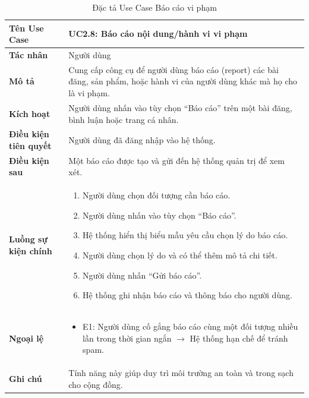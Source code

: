 \begin{table}[H]
\centering
\begin{tabularx}{\textwidth}{|l|X|}
\hline
\textbf{Tên Use Case} & \textbf{UC2.8: Báo cáo nội dung/hành vi vi phạm} \\ \hline
\textbf{Tác nhân} & Người dùng \\ \hline
\textbf{Mô tả} & Cung cấp công cụ để người dùng báo cáo (report) các bài đăng, sản phẩm, hoặc hành vi của người dùng khác mà họ cho là vi phạm. \\ \hline
\textbf{Kích hoạt} & Người dùng nhấn vào tùy chọn ``Báo cáo'' trên một bài đăng, bình luận hoặc trang cá nhân. \\ \hline
\textbf{Điều kiện tiên quyết} & Người dùng đã đăng nhập vào hệ thống. \\ \hline
\textbf{Điều kiện sau} & Một báo cáo được tạo và gửi đến hệ thống quản trị để xem xét. \\ \hline
\textbf{Luồng sự kiện chính} & 
\begin{enumerate}
    \item Người dùng chọn đối tượng cần báo cáo.
    \item Người dùng nhấn vào tùy chọn ``Báo cáo''.
    \item Hệ thống hiển thị biểu mẫu yêu cầu chọn lý do báo cáo.
    \item Người dùng chọn lý do và có thể thêm mô tả chi tiết.
    \item Người dùng nhấn ``Gửi báo cáo''.
    \item Hệ thống ghi nhận báo cáo và thông báo cho người dùng.
\end{enumerate} \\ \hline
\textbf{Ngoại lệ} & 
\begin{itemize}
    \item E1: Người dùng cố gắng báo cáo cùng một đối tượng nhiều lần trong thời gian ngắn $\rightarrow$ Hệ thống hạn chế để tránh spam.
\end{itemize} \\ \hline
\textbf{Ghi chú} & Tính năng này giúp duy trì môi trường an toàn và trong sạch cho cộng đồng. \\ \hline
\end{tabularx}
\caption{Đặc tả Use Case Báo cáo vi phạm}
\end{table}
